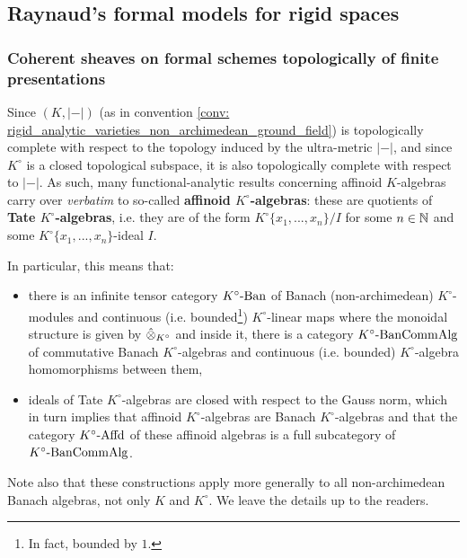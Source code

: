     \subsection{Raynaud's formal models for rigid spaces}
        \subsubsection{Coherent sheaves on formal schemes topologically of finite presentations}
            \begin{remark} \label{remark: affinoids_over_complete_valuation_rings}
                Since $(K, |-|)$ (as in convention \ref{conv: rigid_analytic_varieties_non_archimedean_ground_field}) is topologically complete with respect to the topology induced by the ultra-metric $|-|$, and since $K^{\circ}$ is a closed topological subspace, it is also topologically complete with respect to $|-|$. As such, many functional-analytic results concerning affinoid $K$-algebras carry over \textit{verbatim} to so-called \textbf{affinoid $K^{\circ}$-algebras}: these are quotients of \textbf{Tate $K^{\circ}$-algebras}, i.e. they are of the form $K^{\circ}\{x_1, ..., x_n\}/I$ for some $n \in \mathbb{N}$ and some $K^{\circ}\{x_1, ..., x_n\}$-ideal $I$.
                
                In particular, this means that:
                    \begin{itemize}
                        \item there is an infinite tensor category $K^{\circ}\text{-}\mathrm{Ban}$ of Banach (non-archimedean) $K^{\circ}$-modules and continuous (i.e. bounded\footnote{In fact, bounded by $1$.}) $K^{\circ}$-linear maps where the monoidal structure is given by $\hattensor_{K^{\circ}}$ and inside it, there is a category $K^{\circ}\text{-}\mathrm{Ban}\mathrm{Comm}\mathrm{Alg}$ of commutative Banach $K^{\circ}$-algebras and continuous (i.e. bounded) $K^{\circ}$-algebra homomorphisms between them,
                        \item ideals of Tate $K^{\circ}$-algebras are closed with respect to the Gauss norm, which in turn implies that affinoid $K^{\circ}$-algebras are Banach $K^{\circ}$-algebras and that the category $K^{\circ}\text{-}\mathrm{Affd}$ of these affinoid algebras is a full subcategory of $K^{\circ}\text{-}\mathrm{Ban}\mathrm{Comm}\mathrm{Alg}$.
                    \end{itemize}
                
                Note also that these constructions apply more generally to all non-archimedean Banach algebras, not only $K$ and $K^{\circ}$. We leave the details up to the readers.
            \end{remark}

